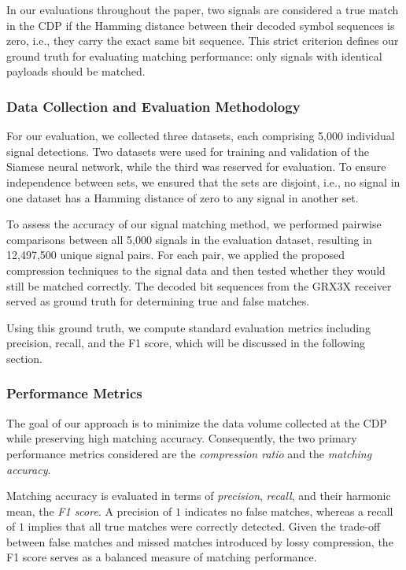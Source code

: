 \documentclass[sigconf, 10pt, nonacm, anonymous]{acmart}  %
\begin{document}
In our evaluations throughout the paper, two signals are considered a true match in the CDP if the Hamming distance between their decoded symbol sequences is zero, i.e., they carry the exact same bit sequence. This strict criterion defines our ground truth for evaluating matching performance: only signals with identical payloads should be matched.

\subsubsection{Data Collection and Evaluation Methodology}

For our evaluation, we collected three datasets, each comprising 5,000 individual signal detections. Two datasets were used for training and validation of the Siamese neural network, while the third was reserved for evaluation. To ensure independence between sets, we ensured that the sets are disjoint, i.e., no signal in one dataset has a Hamming distance of zero to any signal in another set.

To assess the accuracy of our signal matching method, we performed pairwise comparisons between all 5,000 signals in the evaluation dataset, resulting in 12,497,500 unique signal pairs. For each pair, we applied the proposed compression techniques to the signal data and then tested whether they would still be matched correctly. The decoded bit sequences from the GRX3X receiver served as ground truth for determining true and false matches.

Using this ground truth, we compute standard evaluation metrics including precision, recall, and the F1 score, which will be discussed in the following section.

\subsubsection{Performance Metrics}
\label{sec:performance_metrics}

The goal of our approach is to minimize the data volume collected at the CDP while preserving high matching accuracy. Consequently, the two primary performance metrics considered are the \emph{compression ratio} and the \emph{matching accuracy}.

Matching accuracy is evaluated in terms of \emph{precision}, \emph{recall}, and their harmonic mean, the \emph{F1 score}. A precision of $1$ indicates no false matches, whereas a recall of $1$ implies that all true matches were correctly detected. Given the trade-off between false matches and missed matches introduced by lossy compression, the F1 score serves as a balanced measure of matching performance.
\end{document}
